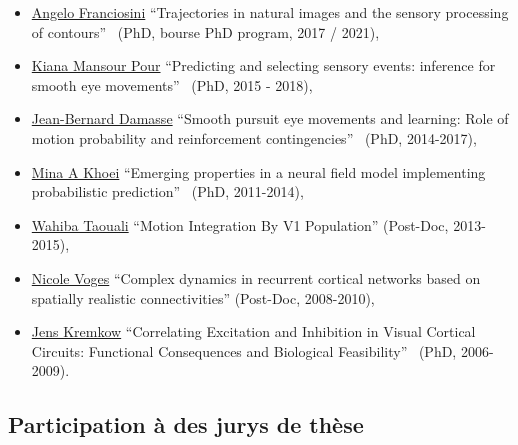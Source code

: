 \documentclass[10pt,french,a4paper,oneside]{article}%
\begin{document}
\begin{itemize}
	\item \href{https://laurentperrinet.github.io/author/angelo-franciosini/}{Angelo Franciosini} ``Trajectories in natural images and the sensory processing of contours''~\textcite{Franciosini21thesis} (PhD, bourse PhD program, 2017 / 2021),
	\item \href{https://laurentperrinet.github.io/author/kiana-mansour-pour/}{Kiana Mansour Pour} 	``Predicting and selecting sensory events: inference for smooth eye movements''~\citep{MansourPour19thesis} (PhD, 2015 - 2018),
	\item \href{https://laurentperrinet.github.io/author/jean-bernard-damasse/}{Jean-Bernard Damasse} 	``Smooth pursuit eye movements and learning: Role of motion probability and reinforcement contingencies''~\citep{Damasse18thesis} (PhD, 2014-2017),
	\item \href{https://laurentperrinet.github.io/author/mina-a-khoei/}{Mina A Khoei} 	``Emerging properties in a neural field model implementing probabilistic prediction''~\textcite{Khoei14thesis} (PhD, 2011-2014),
	\item \href{https://laurentperrinet.github.io/author/wahiba-taouali/}{Wahiba Taouali} 	``Motion Integration By V1 Population'' (Post-Doc, 2013-2015),
	\item \href{https://laurentperrinet.github.io/author/nicole-voges/}{Nicole Voges} 	``Complex dynamics in recurrent cortical networks based on spatially realistic connectivities'' (Post-Doc, 2008-2010),
	\item \href{https://laurentperrinet.github.io/author/jens-kremkow/}{Jens Kremkow} ``Correlating Excitation and Inhibition in Visual Cortical Circuits: Functional Consequences and Biological Feasibility''~\citep{Kremkow09thesis} (PhD, 2006-2009).
\end{itemize}

\subsection{Participation à des jurys de thèse} %
\end{document}
